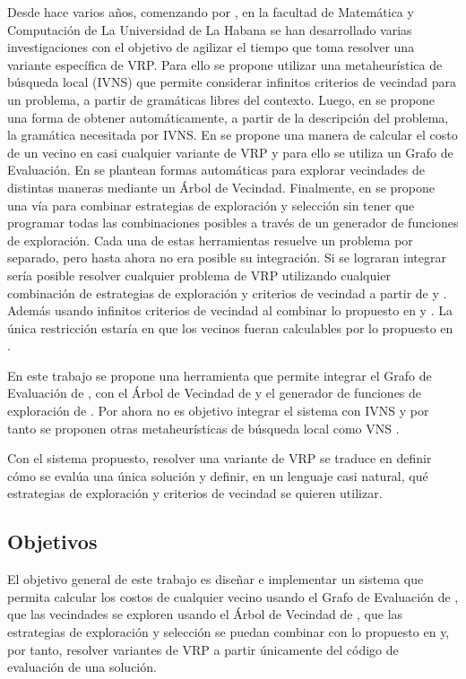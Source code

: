 
Desde hace varios años, comenzando por \cite{Camila}, en la facultad de Matemática y Computación de La Universidad de La Habana se han desarrollado varias investigaciones con el objetivo de agilizar el tiempo que toma resolver una variante específica de VRP. Para ello se propone utilizar una metaheurística de búsqueda local (IVNS) que permite considerar infinitos criterios de vecindad para un problema, a partir de gramáticas libres del contexto. Luego, en \cite{Daniela} se propone una forma de obtener automáticamente, a partir de la descripción del problema, la gramática necesitada por IVNS. En \cite{JJ} se propone una manera de calcular el costo de un vecino en casi cualquier variante de VRP y para ello se utiliza un Grafo de Evaluación. En \cite{Hector} se plantean formas automáticas para explorar vecindades de distintas maneras mediante un Árbol de Vecindad. Finalmente, en \cite{Heidy} se propone una vía para combinar estrategias de exploración y selección sin tener que programar todas las combinaciones posibles a través de un generador de funciones de exploración. Cada una de estas herramientas resuelve un problema por separado, pero hasta ahora no era posible su integración. Si se lograran integrar sería posible resolver cualquier problema de VRP utilizando cualquier combinación de estrategias de exploración y criterios de vecindad a partir de \cite{Hector} y \cite{Hector}. Además usando infinitos criterios de vecindad al combinar lo propuesto en \cite{Camila} y \cite{Daniela}. La única restricción estaría en que los vecinos fueran calculables por lo propuesto en \cite{JJ}.

En este trabajo se propone una herramienta que permite integrar el Grafo de Evaluación de \cite{JJ}, con el Árbol de Vecindad de \cite{Hector} y el generador de funciones de exploración de \cite{Heidy}. Por ahora no es objetivo integrar el sistema con IVNS y por tanto se proponen otras metaheurísticas de búsqueda local como VNS \cite{TODO}.

Con el sistema propuesto, resolver una variante de VRP se traduce en definir cómo se evalúa una única solución y definir, en un lenguaje casi natural, qué estrategias de exploración y criterios de vecindad se quieren utilizar.

\subsection*{Objetivos}
El objetivo general de este trabajo es diseñar e implementar un sistema que permita calcular los costos de cualquier vecino usando el Grafo de Evaluación de \cite{JJ}, que las vecindades se exploren usando el Árbol de Vecindad de \cite{Hector}, que las estrategias de exploración y selección se puedan combinar con lo propuesto en \cite{Heidy} y, por tanto, resolver variantes de VRP a partir únicamente del código de evaluación de una solución.

